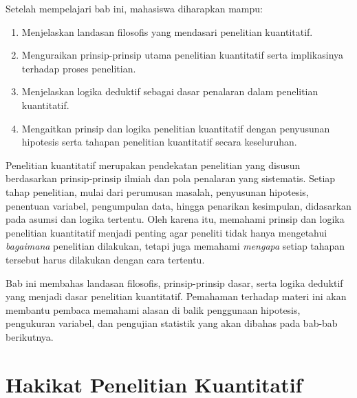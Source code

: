 \documentclass[
  indonesian,
  letterpaper,
  DIV=11,
  numbers=noendperiod]{scrreprt}
\providecommand{\tightlist}{%
  \setlength{\itemsep}{0pt}\setlength{\parskip}{0pt}}
\begin{document}
\begin{tcolorbox}[enhanced jigsaw, colframe=quarto-callout-note-color-frame, toptitle=1mm, breakable, leftrule=.75mm, arc=.35mm, toprule=.15mm, colback=white, colbacktitle=quarto-callout-note-color!10!white, bottomtitle=1mm, bottomrule=.15mm, titlerule=0mm, title=\textcolor{quarto-callout-note-color}{\faInfo}\hspace{0.5em}{Capaian Pembelajaran}, coltitle=black, left=2mm, opacitybacktitle=0.6, opacityback=0, rightrule=.15mm]

Setelah mempelajari bab ini, mahasiswa diharapkan mampu:

\begin{enumerate}
\def\labelenumi{\arabic{enumi}.}
\tightlist
\item
  Menjelaskan landasan filosofis yang mendasari penelitian kuantitatif.
\item
  Menguraikan prinsip-prinsip utama penelitian kuantitatif serta
  implikasinya terhadap proses penelitian.
\item
  Menjelaskan logika deduktif sebagai dasar penalaran dalam penelitian
  kuantitatif.
\item
  Mengaitkan prinsip dan logika penelitian kuantitatif dengan penyusunan
  hipotesis serta tahapan penelitian kuantitatif secara keseluruhan.
\end{enumerate}

\end{tcolorbox}

Penelitian kuantitatif merupakan pendekatan penelitian yang disusun
berdasarkan prinsip-prinsip ilmiah dan pola penalaran yang sistematis.
Setiap tahap penelitian, mulai dari perumusan masalah, penyusunan
hipotesis, penentuan variabel, pengumpulan data, hingga penarikan
kesimpulan, didasarkan pada asumsi dan logika tertentu. Oleh karena itu,
memahami prinsip dan logika penelitian kuantitatif menjadi penting agar
peneliti tidak hanya mengetahui \emph{bagaimana} penelitian dilakukan,
tetapi juga memahami \emph{mengapa} setiap tahapan tersebut harus
dilakukan dengan cara tertentu.

Bab ini membahas landasan filosofis, prinsip-prinsip dasar, serta logika
deduktif yang menjadi dasar penelitian kuantitatif. Pemahaman terhadap
materi ini akan membantu pembaca memahami alasan di balik penggunaan
hipotesis, pengukuran variabel, dan pengujian statistik yang akan
dibahas pada bab-bab berikutnya.

\section{Hakikat Penelitian
Kuantitatif}\label{hakikat-penelitian-kuantitatif}
\end{document}
